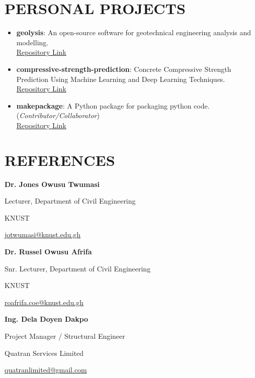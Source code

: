 \documentclass[letterpaper, 12pt]{article}
\newcommand{\cvsection}[1]{

	\section*{#1}
}
\begin{document}

\cvsection{PERSONAL PROJECTS}

\begin{itemize}[leftmargin=*]

	\item \textbf{geolysis}: An open-source software for geotechnical engineering analysis and modelling. \\ \href{https://www.github.com/patrickboateng/geolysis}{Repository Link}

	\item \textbf{compressive-strength-prediction}: Concrete Compressive Strength Prediction Using Machine Learning and Deep Learning Techniques. \href{https://github.com/patrickboateng/compressive-strength-prediction}{Repository Link}

	\item \textbf{makepackage}: A Python package for packaging python code. (\textit{Contributor/Collaborator}) \\
	      \href{https://github.com/nyggus/makepackage/graphs/contributors}{Repository Link}

\end{itemize}


\cvsection{REFERENCES}


\begin{multicols}{2}
	\textbf{Dr. Jones Owusu Twumasi} \par
	Lecturer, Department of Civil Engineering \par
	KNUST \par
	\faEnvelopeSquare \space \href{mailto:jotwumasi@knust.edu.gh}{jotwumasi@knust.edu.gh} \par
	\faPhone {} \vspace*{0.5cm}

	\textbf{Dr. Russel Owusu Afrifa} \par
	Snr. Lecturer, Department of Civil Engineering \par
	KNUST \par
	\faEnvelopeSquare \space \href{mailto:roafrifa.coe@knust.edu.gh}{roafrifa.coe@knust.edu.gh} \par
	\faPhone {} \vspace*{0.5cm}

	\columnbreak

	\textbf{Ing. Dela Doyen Dakpo} \par
	Project Manager / Structural Engineer \par
	Quatran Services Limited \par
	\faEnvelopeSquare \space \href{mailto:quatranlimited@gmail.com}{quatranlimited@gmail.com} \par
	\faPhone {} \vspace*{0.5cm}




\end{multicols}
\end{document}
